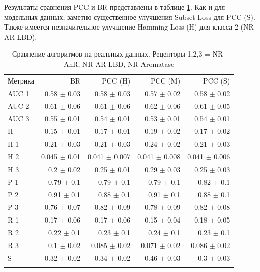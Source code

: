 \documentclass[12pt,twoside]{article}
\begin{document}
Результаты сравнения PCC и BR представлены в таблице \ref{t:realData}. Как и для модельных данных, заметно существенное улучшения Subset Loss для PCC (S). Также имеется незначительное улучшение Hamming Loss (H) для класса 2 (NR-AR-LBD).
\begin{table}[H]%
	\caption{Сравнение алгоритмов на реальных данных. Рецепторы 1,2,3 = NR-AhR, NR-AR-LBD, NR-Aromatase}
	\label{t:realData}
	\centering\medskip%
\begin{tabular}{lrrrr}
	\headline
	{Метрика} &             BR &           PCC (H) &          PCC (M) &           PCC (S) \\
	\headline
	AUC 1 &   0.58 $\pm$ 0.03 &    0.58 $\pm$ 0.03 &    0.57 $\pm$ 0.02 &    0.58 $\pm$ 0.02 \\
	AUC 2 &   0.61 $\pm$ 0.06 &    0.61 $\pm$ 0.06 &    0.62 $\pm$ 0.06 &    0.61 $\pm$ 0.05 \\
	AUC 3 &   0.55 $\pm$ 0.01 &    0.54 $\pm$ 0.01 &    0.53 $\pm$ 0.01 &    0.54 $\pm$ 0.01 \\
	H     &   0.15 $\pm$ 0.01 &    0.17 $\pm$ 0.01 &    0.19 $\pm$ 0.02 &    0.17 $\pm$ 0.02 \\
	H 1   &   0.21 $\pm$ 0.03 &    0.21 $\pm$ 0.03 &    0.24 $\pm$ 0.02 &    0.21 $\pm$ 0.03 \\
	H 2   &  0.045 $\pm$ 0.01 &  0.041 $\pm$ 0.007 &  0.041 $\pm$ 0.008 &  0.041 $\pm$ 0.006 \\
	H 3   &    0.2 $\pm$ 0.02 &    0.25 $\pm$ 0.01 &    0.29 $\pm$ 0.03 &    0.25 $\pm$ 0.03 \\
	P 1   &    0.79 $\pm$ 0.1 &     0.79 $\pm$ 0.1 &     0.79 $\pm$ 0.1 &     0.82 $\pm$ 0.1 \\
	P 2   &    0.91 $\pm$ 0.1 &     0.88 $\pm$ 0.1 &     0.91 $\pm$ 0.1 &     0.88 $\pm$ 0.1 \\
	P 3   &   0.76 $\pm$ 0.07 &    0.82 $\pm$ 0.09 &    0.78 $\pm$ 0.09 &    0.82 $\pm$ 0.08 \\
	R 1   &   0.17 $\pm$ 0.06 &    0.17 $\pm$ 0.06 &    0.15 $\pm$ 0.04 &    0.18 $\pm$ 0.05 \\
	R 2   &    0.22 $\pm$ 0.1 &     0.23 $\pm$ 0.1 &     0.24 $\pm$ 0.1 &     0.23 $\pm$ 0.1 \\
	R 3   &    0.1 $\pm$ 0.02 &   0.085 $\pm$ 0.02 &   0.071 $\pm$ 0.02 &   0.086 $\pm$ 0.02 \\
	S     &   0.32 $\pm$ 0.02 &    0.34 $\pm$ 0.02 &    0.46 $\pm$ 0.03 &     0.3 $\pm$ 0.03 \\
	\headline
\end{tabular}
\end{table}
\end{document}
